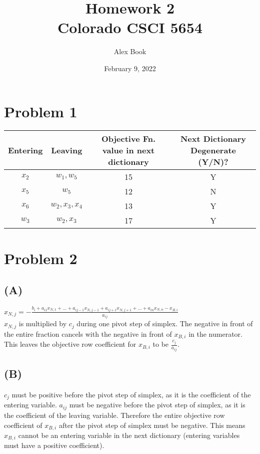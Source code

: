 \documentclass[12pt]{article}
\begin{document}
\title{Homework 2 \\
       Colorado CSCI 5654}
\author{Alex Book}
\date{February 9, 2022}
\maketitle


\section*{Problem 1}
\begin{tabular}{|c|c|c|c|}
    \hline
    Entering & Leaving & Objective Fn. value in next dictionary & Next Dictionary Degenerate (Y/N)? \\
    \hline
    $x_2$ & $w_1, w_5$ & 15 & Y \\
    \hline
    $x_5$ & $w_5$ & 12 & N \\
    \hline
    $x_6$ & $w_2, x_3, x_4$ & 13 & Y \\
    \hline
    $w_3$ & $w_2, x_3$ & 17 & Y \\
    \hline
\end{tabular}

\newpage
\section*{Problem 2}
\subsection*{(A)}
$x_{N,j} = -\frac {b_i + a_{i1}x_{N,1} + \dots + a_{i j-1}x_{N,j-1} + a_{i j+1}x_{N,j+1} + \dots + a_{i n}x_{N,n} - x_{B,i}} {a_{i j}}$ \\
$x_{N,j}$ is multiplied by $c_j$ during one pivot step of simplex. The negative in front of the entire fraction cancels with the negative in front of $x_{B,i}$ in the numerator. This leaves the objective row coefficient for $x_{B, i}$ to be $\frac{c_j}{a_{i j}}$.

\subsection*{(B)}
$c_j$ must be positive before the pivot step of simplex, as it is the coefficient of the entering variable. $a_{i j}$ must be negative before the pivot step of simplex, as it is the coefficient of the leaving variable. Therefore the entire objective row coefficient of $x_{B, i}$ after the pivot step of simplex must be negative. This means $x_{B, i}$ cannot be an entering variable in the next dictionary (entering variables must have a positive coefficient).
\end{document}
